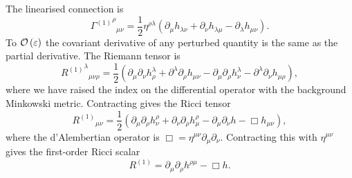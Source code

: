 The linearised connection is
\begin{equation}
{{\Gamma^{(1)}}^\rho}_{\mu\nu} = \frac{1}{2}\eta^{\rho\lambda}(\partial_\mu h_{\lambda\nu} + \partial_\nu h_{\lambda\mu} - \partial_\lambda h_{\mu\nu}).
\label{eq:Lin_Gamma}
\end{equation}
To $\mathcal{O}\left({\varepsilon}\right)$ the covariant derivative of any perturbed quantity is the same as the partial derivative. The Riemann tensor is
\begin{equation}
{{R^{(1)}}^\lambda}_{\mu\nu\rho} = \frac{1}{2}(\partial_\mu\partial_\nu h^\lambda_\rho + \partial^\lambda\partial_\rho h_{\mu\nu} - \partial_\mu\partial_\rho h^\lambda_\nu - \partial^\lambda\partial_\nu h_{\mu\rho}),
\label{eq:Lin_Riemann}
\end{equation}
where we have raised the index on the differential operator with the background Minkowski metric. Contracting gives the Ricci tensor
\begin{equation}
{R^{(1)}}_{\mu\nu} = \frac{1}{2}(\partial_\mu\partial_\rho h^\rho_\nu + \partial_\nu\partial_\rho h^\rho_\mu - \partial_\mu\partial_\nu h - \Box h_{\mu\nu}),
\label{eq:Ricci}
\end{equation}
where the d'Alembertian operator is $\Box = \eta^{\mu\nu}\partial_\mu\partial_\nu$. Contracting this with $\eta^{\mu\nu}$ gives the first-order Ricci scalar
\begin{equation}
R^{(1)} = \partial_\mu\partial_\rho h^{\rho\mu} - \Box h.
\label{eq:Scalar}
\end{equation}

